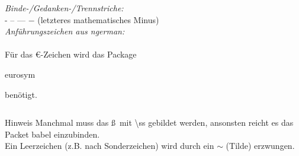 \begin{frame}
\begin{columns}
\begin{column}{0.5\textwidth}
\textit{Binde-\slash Gedanken-\slash Trennstriche:} \\
- -- --- $-$ (letzteres mathematisches Minus) \\

\textit{Anführungszeichen aus ngerman:} \\
\glqq \grqq \flqq \frqq\\[5mm]
Für das \euro -Zeichen wird das Package \begin{ttfamily}eurosym\end{ttfamily}
benötigt.\\

\end{column}
\end{columns}

\begin{block}{Hinweis}
\footnotesize Manchmal muss das \ss ~mit \color{nounibaredI} \textbackslash ss \color{black}gebildet werden, ansonsten reicht es das Packet {\ttfamily babel} einzubinden.\\
Ein Leerzeichen (z.B. nach Sonderzeichen) wird durch ein \color{nounibaredI} $\sim$ \color{black} (Tilde) erzwungen.
\end{block}
\vspace{-8mm}

\end{frame}


